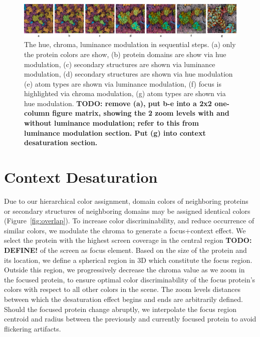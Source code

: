 \documentclass{egpubl}
\begin{document}
		\begin{figure}[t]
			\centering
			\includegraphics[width=1\linewidth]{Figures/results}
			\caption{The hue, chroma, luminance modulation in sequential steps.
				(a) only the protein colors are show, (b) protein domains are show via hue modulation, (c) secondary structures are shown via luminance modulation, (d) secondary structures are shown via hue modulation
				(e) atom types are shown via luminance modulation, (f) focus is highlighted via chroma modulation, (g) atom types are shown via hue modulation. \textbf{TODO: remove (a), put b-e into a 2x2 one-column figure matrix, showing the 2 zoom levels with and without luminance modulation; refer to this from luminance modulation section. Put (g) into context desaturation section. }}
			\label{fig:results_2}
		\end{figure}
	
	
	

	
	
	\section{Context Desaturation}
	\label{sec:chroma}
	
	
	Due to our hierarchical color assignment, domain colors of neighboring proteins or secondary structures of neighboring domains may be assigned identical colors (Figure~\ref{fig:overlap}).
	To increase color discriminability, and reduce occurrence of similar colors, we modulate the chroma to generate a focus+context effect. 
	We select the protein with the highest screen coverage in the central region \textbf{TODO: DEFINE!} of the screen as focus element.
	Based on the size of the protein and its location, we define a spherical region in 3D which constitute the focus region.
	Outside this region, we progressively decrease the chroma value as we zoom in the focused protein, to ensure optimal color discriminability of the focus protein's colors with respect to all other colors in the scene. 
	The zoom levels distances between which the desaturation effect begins and ends are arbitrarily defined.
	Should the focused protein change abruptly, we interpolate the focus region centroid and radius between the previously and currently focused protein to avoid flickering artifacts.
	
\end{document}
